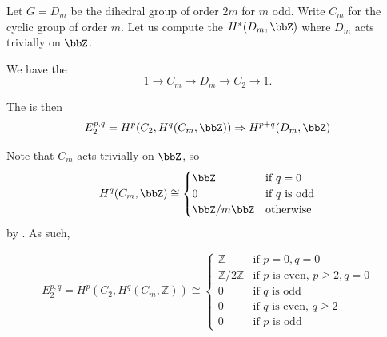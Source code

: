 \begin{example}
    Let $G = D_m$ be the dihedral group of order $2m$ for $m$ odd. Write $C_m$ for the cyclic group of order $m$. Let us compute the  $H^*(D_m, \bbZ)$ where $D_m$ acts trivially on $\bbZ$. 
    
    We have the 
    $$1 \to C_m \to D_m \to C_2 \to 1.$$

    The  is then 
    $$E_2^{p,q} = H^p(C_2, H^q(C_m, \bbZ)) \Rightarrow H^{p+q}(D_m, \bbZ) $$

    Note that $C_m$ acts trivially on $\bbZ$, so 
    $$H^q(C_m, \bbZ) \cong \begin{cases} \bbZ &\text{if } q = 0 \\ 0 &\text{if } q \text{ is odd} \\ \bbZ/m\bbZ &\text{otherwise } \end{cases} $$
    by . As such, 

    $$ E_2^{p,q} = H^p(C_2, H^q(C_m, \mathbb{Z})) \cong \begin{cases} 
    \mathbb{Z} & \text{if } p = 0, q = 0 \\
    \mathbb{Z}/2\mathbb{Z} & \text{if } p \text{ is even, } p \ge 2, q = 0 \\
    0 & \text{if } q \text{ is odd} \\
    0 & \text{if } q \text{ is even, } q \ge 2 \\
    0 & \text{if } p \text{ is odd}
    \end{cases} $$

    \begin{center}
    \small
    \end{center}


\end{example}
